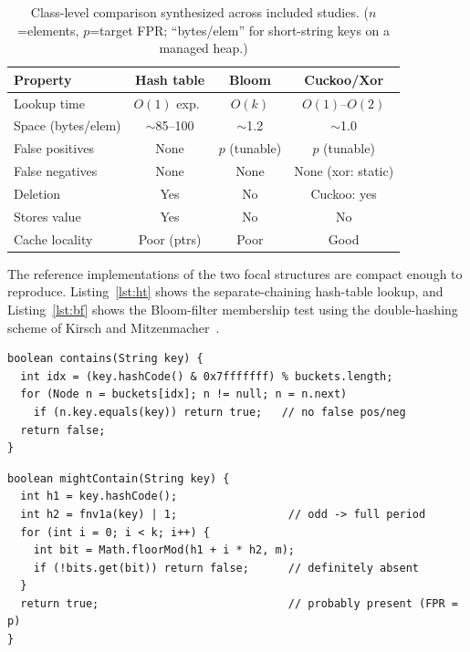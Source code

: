 \documentclass[conference]{IEEEtran}
\begin{document}
\begin{table}[!t]
\caption{Class-level comparison synthesized across included studies.
($n$=elements, $p$=target FPR; ``bytes/elem'' for short-string keys on a managed heap.)}
\label{tab:compare}
\centering
\renewcommand{\arraystretch}{1.3}
\footnotesize
\begin{tabular}{@{}lccc@{}}
\toprule
\textbf{Property} & \textbf{Hash table} & \textbf{Bloom} & \textbf{Cuckoo/Xor} \\
\midrule
Lookup time        & $O(1)$ exp.\ & $O(k)$      & $O(1)$--$O(2)$ \\
Space (bytes/elem) & $\sim$85--100 & $\sim$1.2  & $\sim$1.0 \\
False positives    & None         & $p$ (tunable) & $p$ (tunable) \\
False negatives    & None         & None       & None (xor: static) \\
Deletion           & Yes          & No         & Cuckoo: yes \\
Stores value       & Yes          & No         & No \\
Cache locality     & Poor (ptrs)  & Poor       & Good \\
\bottomrule
\end{tabular}
\end{table}

The reference implementations of the two focal structures are compact enough to
reproduce. Listing~\ref{lst:ht} shows the separate-chaining hash-table lookup,
and Listing~\ref{lst:bf} shows the Bloom-filter membership test using the
double-hashing scheme of Kirsch and Mitzenmacher~\cite{kirsch2008less}.

\begin{lstlisting}[caption={Separate-chaining hash-table lookup (exact).},label={lst:ht}]
boolean contains(String key) {
  int idx = (key.hashCode() & 0x7fffffff) % buckets.length;
  for (Node n = buckets[idx]; n != null; n = n.next)
    if (n.key.equals(key)) return true;   // no false pos/neg
  return false;
}
\end{lstlisting}

\begin{lstlisting}[caption={Bloom-filter membership test with double hashing (k derived from 2 hashes).},label={lst:bf}]
boolean mightContain(String key) {
  int h1 = key.hashCode();
  int h2 = fnv1a(key) | 1;                 // odd -> full period
  for (int i = 0; i < k; i++) {
    int bit = Math.floorMod(h1 + i * h2, m);
    if (!bits.get(bit)) return false;      // definitely absent
  }
  return true;                             // probably present (FPR = p)
}
\end{lstlisting}
\end{document}
